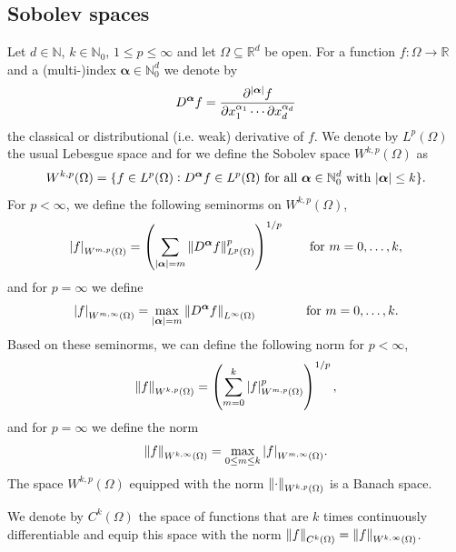 \documentclass{article}
\numberwithin{equation}{section}
\newcommand{\N}{\mathbb{N}}
\newcommand{\bmalpha}{{\bm{\alpha}}}
\newcommand{\1}{\mathbbm{1}}
\begin{document}
\subsection{Sobolev spaces}\label{app:sobolev}

Let $d\in\mathbb{N}$, $k\in\mathbb{N}_0$, $1\leq p\leq \infty$ and let $\Omega \subseteq \mathbb{R}^d$ be open. For a function $f:\Omega\to\mathbb{R}$ and a (multi-)index $\bmalpha \in \N^d_0$ we denote by 
\begin{equation}
    D^\bmalpha f= \frac{\partial^{\abs{\bmalpha}} f}{\partial x_1^{\alpha_1}\cdots \partial x_d^{\alpha_d}}
\end{equation}
the classical or distributional (i.e. weak) derivative of $f$. 
We denote by $L^p(\Omega)$ the usual Lebesgue space and for we define the Sobolev space $W^{k,p}(\Omega)$ as
\begin{equation}
    W^{k,p}(\Omega) = \{f \in L^p(\Omega): D^\bmalpha f \in L^p(\Omega) \text{ for all } \bmalpha\in\mathbb{N}^d_0 \text{ with } \abs{\bmalpha}\leq k\}. 
\end{equation}
For $p<\infty$, we define the following seminorms on $W^{k,p}(\Omega)$, 
\begin{equation}
    \abs{f}_{W^{m,p}(\Omega)} = \left(\sum_{\abs{\bmalpha}= m}\norm{D^\bmalpha f}^p_{L^p(\Omega)}\right)^{1/p} \qquad \text{for } m=0,\ldots, k, 
\end{equation}
and for $p=\infty$ we define
\begin{equation}
    \abs{f}_{W^{m,\infty}(\Omega)} =\max_{\abs{\bmalpha}= m} \norm{D^\bmalpha f}_{L^\infty(\Omega)}\qquad \qquad \text{for } m=0,\ldots, k. 
\end{equation}
Based on these seminorms, we can define the following norm for $p<\infty$,
\begin{equation}
    \norm{f}_{W^{k,p}(\Omega)} = \left(\sum_{m=0}^k \abs{f}_{W^{m,p}(\Omega)}^p\right)^{1/p}, 
\end{equation}
and for $p=\infty$ we define the norm
\begin{equation}
    \norm{f}_{W^{k,\infty}(\Omega)} =\max_{0\leq m\leq k}  \abs{f}_{W^{m,\infty}(\Omega)}. 
\end{equation}
The space $W^{k,p}(\Omega)$ equipped with the norm $\norm{\cdot}_{W^{k,p}(\Omega)}$ is a Banach space. 

We denote by $C^k(\Omega)$ the space of functions that are $k$ times continuously differentiable and equip this space with the norm $\norm{f}_{C^k(\Omega)} = \norm{f}_{W^{k,\infty}(\Omega)}$.
\end{document}
